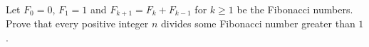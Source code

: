 Let $F_0=0$, $F_1=1$ and $F_{k+1}=F_k+F_{k-1}$ for $k\ge1$ be the Fibonacci numbers. Prove that every positive integer $n$ divides some Fibonacci number greater than $1$.
